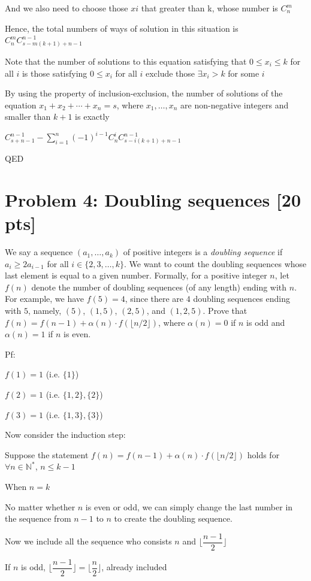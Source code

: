 \documentclass[11pt,twoside]{article}
\newcommand{\problem}[1]{\section*{Problem #1}}
\begin{document}
And we also need to choose those $xi$ that greater than k, whose number is $C^m_n$

Hence, the total numbers of ways of solution in this situation is $C^m_nC^{n-1}_{s-m(k+1)+n-1}$

Note that the number of solutions to this equation satisfying that $0\leq x_i \leq k$ for all $i$ is those satisfying $0\leq x_i$ for all $i$ exclude those $\exists x_i > k$ for some $i$

By using the property of inclusion-exclusion, the number of solutions of the equation $x_1+x_2+\cdots+x_n = s$, where $x_1,\dots,x_n$ are non-negative integers and smaller than $k+1$ is exactly

$C^{n-1}_{s+n-1}-\sum ^n_{i=1} (-1)^{i-1 } C^i_nC^{n-1}_{s-i(k+1)+n-1}$

QED

\problem{4: Doubling sequences [20 pts]} 
We say a sequence $(a_1,\dots,a_k)$ of positive integers is a \textit{doubling sequence} if $a_i \geq 2a_{i-1}$ for all $i \in \{2,3,\dots,k\}$.
We want to count the doubling sequences whose last element is equal to a given number.
Formally, for a positive integer $n$, let $f(n)$ denote the number of doubling sequences (of any length) ending with $n$.
For example, we have $f(5) = 4$, since there are $4$ doubling sequences ending with $5$, namely, $(5)$, $(1,5)$, $(2,5)$, and $(1,2,5)$.
Prove that $f(n) = f(n-1) + \alpha(n) \cdot f(\lfloor n/2 \rfloor)$, where $\alpha(n) = 0$ if $n$ is odd and $\alpha(n) = 1$ if $n$ is even.

\hspace*{\fill}

Pf:

$f(1) = 1$ (i.e. $\{1\}$)

$f(2) = 1$ (i.e. $\{1,2\},\{2\}$)

$f(3) = 1$ (i.e. $\{1,3\},\{3\}$)


Now consider the induction step:

Suppose the statement $f(n) = f(n-1) + \alpha(n) \cdot f(\lfloor n/2 \rfloor)$ holds for $\forall n \in \mathbb{N^*}$, $n \leq k-1 $

When $n = k$

No matter whether $n$ is even or odd, we can simply change the last number in the sequence from $n-1$ to $n$ to create the doubling sequence.

Now we include all the sequence who consists $n$ and $\lfloor \dfrac{n-1}{2}\rfloor$ 

If $n$ is odd, $\lfloor \dfrac{n-1}{2}\rfloor = \lfloor \dfrac{n}{2}\rfloor$, already included
\end{document}
